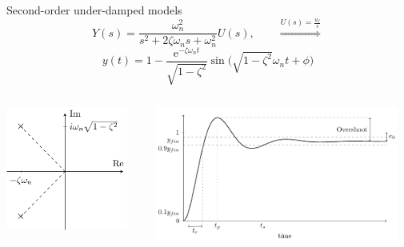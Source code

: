 \documentclass[presentation,aspectratio=169]{beamer}
\begin{document}
\begin{frame}[label={sec:org7b1d386}]{Second-order under-damped models}
$$ Y(s) = \frac{\omega_n^2}{s^2 + 2\zeta\omega_n s + \omega_n^2} U(s), \qquad \overset{U(s) = \frac{u_f}{s}}{\Longrightarrow} $$
$$     y(t) = 1 - \frac{\mathrm{e}^{-\zeta\omega_nt}}{\sqrt{1-\zeta^2}} \sin\big( \sqrt{1-\zeta^2}\omega_n t + \phi \big) $$


\begin{columns}
\begin{column}{0.3\columnwidth}
\begin{center}
    \includegraphics[width=4cm]{../../figures/implane-second-order-poles}
\end{center}
\end{column}

\begin{column}{0.7\columnwidth}
\begin{center}
    \includegraphics[width=8cm]{../../figures/step-response-specifications}
\end{center}
\end{column}
\end{columns}
\end{frame}
\end{document}
